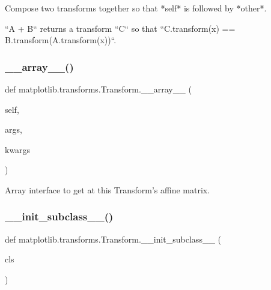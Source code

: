 \begin{DoxyVerb}Compose two transforms together so that *self* is followed by *other*.

``A + B`` returns a transform ``C`` so that
``C.transform(x) == B.transform(A.transform(x))``.
\end{DoxyVerb}
 \mbox{\label{classmatplotlib_1_1transforms_1_1Transform_a43fce7ae28a7b4801ccd4bde51ac9200}} 
\subsubsection{\texorpdfstring{\+\_\+\+\_\+array\+\_\+\+\_\+()}{\_\_array\_\_()}}
{\footnotesize\ttfamily def matplotlib.\+transforms.\+Transform.\+\_\+\+\_\+array\+\_\+\+\_\+ (\begin{DoxyParamCaption}\item[{}]{self,  }\item[{}]{args,  }\item[{}]{kwargs }\end{DoxyParamCaption})}

\begin{DoxyVerb}Array interface to get at this Transform's affine matrix.\end{DoxyVerb}
 \mbox{\label{classmatplotlib_1_1transforms_1_1Transform_a1fc178971ba9c826d86e196d1c1aac20}} 
\subsubsection{\texorpdfstring{\+\_\+\+\_\+init\+\_\+subclass\+\_\+\+\_\+()}{\_\_init\_subclass\_\_()}}
{\footnotesize\ttfamily def matplotlib.\+transforms.\+Transform.\+\_\+\+\_\+init\+\_\+subclass\+\_\+\+\_\+ (\begin{DoxyParamCaption}\item[{}]{cls }\end{DoxyParamCaption})}

